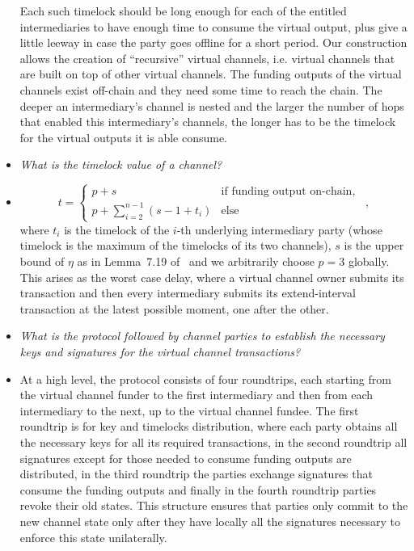 \begin{itemize}
  Each such timelock should be long enough for each of the entitled
  intermediaries to have enough time to consume the virtual output, plus give a
  little leeway in case the party goes offline for a short period. Our
  construction allows the creation of ``recursive'' virtual channels, i.e.
  virtual channels that are built on top of other virtual channels. The funding
  outputs of the virtual channels exist off-chain and they need some time to
  reach the chain. The deeper an intermediary's channel is nested and the larger
  the number of hops that enabled this intermediary's channels, the longer has
  to be the timelock for the virtual outputs it is able consume.
  \item \emph{What is the timelock value of a channel?}
  \item
  \begin{equation}
    t =
      \begin{cases}
        p + s & \mbox{if funding output on-chain}, \\
        p + \sum\limits_{i = 2}^{n-1}(s - 1 + t_i) & \mbox{else}
      \end{cases} \enspace,
  \end{equation}
  where $t_i$ is the timelock of the $i$-th underlying intermediary party (whose
  timelock is the maximum of the timelocks of its two channels), $s$ is the
  upper bound of $\eta$ as in Lemma~7.19 of~\cite{BMTZ17} and we arbitrarily
  choose $p = 3$ globally. This arises as the worst case delay, where a virtual
  channel owner submits its transaction and then every intermediary submits its
  extend-interval transaction at the latest possible moment, one after the
  other.
  \item \emph{What is the protocol followed by channel parties to establish the
  necessary keys and signatures for the virtual channel transactions?}
  \item At a high level, the protocol consists of four roundtrips, each starting
  from the virtual channel funder to the first intermediary and then from each
  intermediary to the next, up to the virtual channel fundee. The first
  roundtrip is for key and timelocks distribution, where each party obtains all
  the necessary keys for all its required transactions, in the second roundtrip
  all signatures except for those needed to consume funding outputs are
  distributed, in the third roundtrip the parties exchange signatures that
  consume the funding outputs and finally in the fourth roundtrip parties revoke
  their old states. This structure ensures that parties only commit to the new
  channel state only after they have locally all the signatures necessary to
  enforce this state unilaterally.
\end{itemize}
